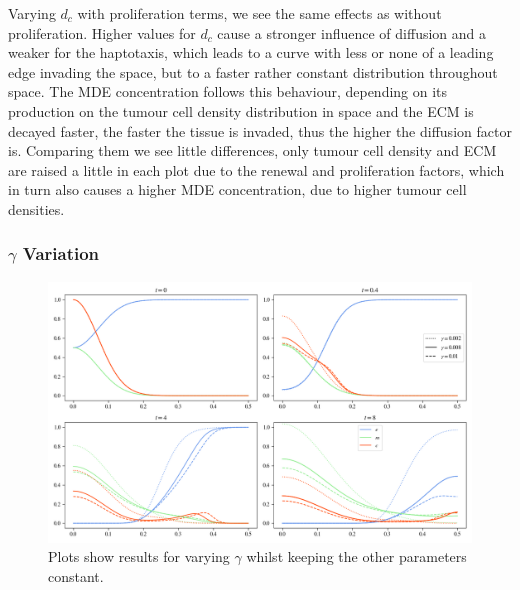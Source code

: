 Varying $d_c$ with proliferation terms, we see the same effects as without proliferation. Higher values for $d_c$ cause a stronger influence of diffusion and a weaker for the haptotaxis, which leads to a curve with less or none of a leading edge invading the space, but to a faster rather constant distribution throughout space. The MDE concentration follows this behaviour, depending on its production on the tumour cell density distribution in space and the ECM is decayed faster, the faster the tissue is invaded, thus the higher the diffusion factor is. Comparing them we see little differences, only tumour cell density and ECM are raised a little in each plot due to the renewal and proliferation factors, which in turn also causes a higher MDE concentration, due to higher tumour cell densities. 


\subsubsection*{$\gamma$ Variation}

\begin{figure}[h]
    \centering
    \includegraphics[width=\textwidth]{resources/images/prolif_gamma_variation.png}
    \caption{Plots show results for varying $\gamma$ whilst keeping the other parameters constant.}
    \label{fig:prolif_gamma_variation}
\end{figure}

